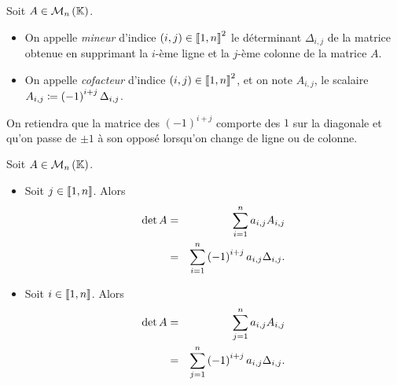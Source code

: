 \documentclass{magnolia}
\begin{document}
\begin{definition}
Soit $A\in\mathcal{M}_{n}\left(\mathbb{K}\right)$.
\begin{itemize}
\item On appelle \emph{mineur} d'indice $\left(i,j\right)\in\left\llbracket 1,n\right\rrbracket^2$ le déterminant $\Delta_{i,j}$ de la
  matrice obtenue en supprimant la $i$-ème ligne et la $j$-ème colonne de la
  matrice $A$.
\item On appelle \emph{cofacteur} d'indice $\left(i,j\right)\in\left\llbracket 1,n\right\rrbracket^2$, et on note $A_{i,j}$, le scalaire
  $A_{i,j}\coloneqq\left(-1\right)^{i+j}\Delta_{i,j}$.
\end{itemize}
\end{definition}

\begin{remarqueUnique}
\remarque On retiendra que la matrice des $(-1)^{i+j}$ comporte des $1$ sur la 
  diagonale et qu'on passe de $\pm 1$ à son opposé lorsqu'on change de ligne ou de colonne.
\end{remarqueUnique}

\begin{proposition}[nom={Développement par rapport à une ligne ou une colonne}]
Soit $A\in\mathcal{M}_{n}\left(\mathbb{K}\right)$.
\begin{itemize}
\item Soit $j\in\left\llbracket 1,n\right\rrbracket$. Alors
  \begin{eqnarray*}
  \mathop{\rm det} A
  &=& \sum_{i=1}^n a_{i,j}A_{i,j}\\
  &=& \sum_{i=1}^n \left(-1\right)^{i+j}a_{i,j}\Delta_{i,j}.
  \end{eqnarray*}
\item Soit $i\in\left\llbracket 1,n\right\rrbracket$. Alors
  \begin{eqnarray*}
  \mathop{\rm det} A
  &=& \sum_{j=1}^n a_{i,j}A_{i,j}\\
  &=& \sum_{j=1}^n \left(-1\right)^{i+j}a_{i,j}\Delta_{i,j}.
  \end{eqnarray*}  
\end{itemize}
\end{proposition}
\end{document}
